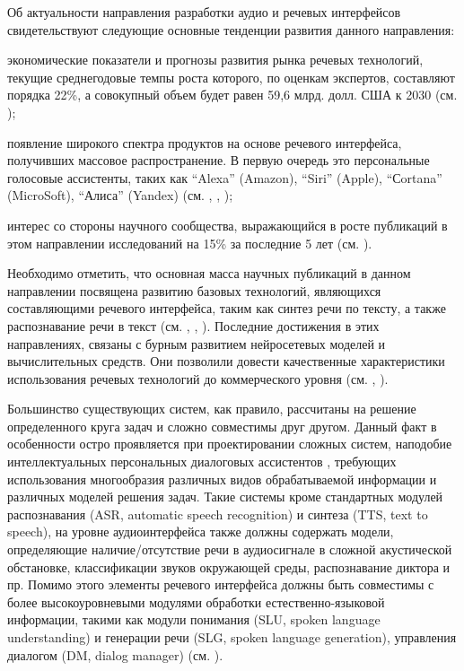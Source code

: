 Об актуальности направления разработки аудио и речевых интерфейсов  свидетельствуют следующие основные тенденции развития данного направления:
\begin{textitemize}    
    \item экономические показатели и прогнозы развития рынка речевых технологий, текущие среднегодовые темпы роста которого, по оценкам экспертов, составляют порядка 22\%, а совокупный объем будет равен 59,6 млрд. долл. США к 2030 (см. );
    \item появление широкого спектра продуктов на основе речевого интерфейса, получивших массовое распространение. В первую очередь это персональные голосовые ассистенты, таких как  ``Alexa'' (Amazon), ``Siri'' (Apple), ``Сortana'' (MicroSoft), ``Алиса'' (Yandex) (см. , , );
    \item интерес со стороны научного сообщества, выражающийся в росте публикаций в этом направлении исследований на 15\% за последние 5 лет (см. ).
\end{textitemize}

Необходимо отметить, что основная масса научных публикаций в данном направлении посвящена развитию базовых технологий, являющихся составляющими речевого интерфейса, таким как синтез речи по тексту, а также распознавание речи в текст (см. , , ). Последние достижения в этих направлениях, связаны с бурным развитием нейросетевых моделей и вычислительных средств. Они позволили довести качественные характеристики использования речевых технологий до коммерческого уровня (см. , ).

Большинство существующих систем, как правило, рассчитаны на решение определенного круга задач и сложно совместимы друг другом. Данный факт в особенности остро проявляется при проектировании сложных систем, наподобие интеллектуальных персональных диалоговых ассистентов  \textit{}, требующих использования многообразия различных видов обрабатываемой информации и различных моделей решения задач. Такие системы кроме стандартных модулей распознавания (ASR, automatic speech recognition) и синтеза (TTS, text to speech), на уровне аудиоинтерфейса также должны содержать модели, определяющие наличие/отсутствие речи в аудиосигнале в сложной акустической обстановке, классификации звуков окружающей среды, распознавание диктора и пр. Помимо этого элементы речевого интерфейса должны быть совместимы с более высокоуровневыми модулями обработки естественно-языковой информации, такими как модули понимания (SLU, spoken language understanding) и генерации речи (SLG, spoken language generation), управления диалогом (DM, dialog manager) (см. ). 

